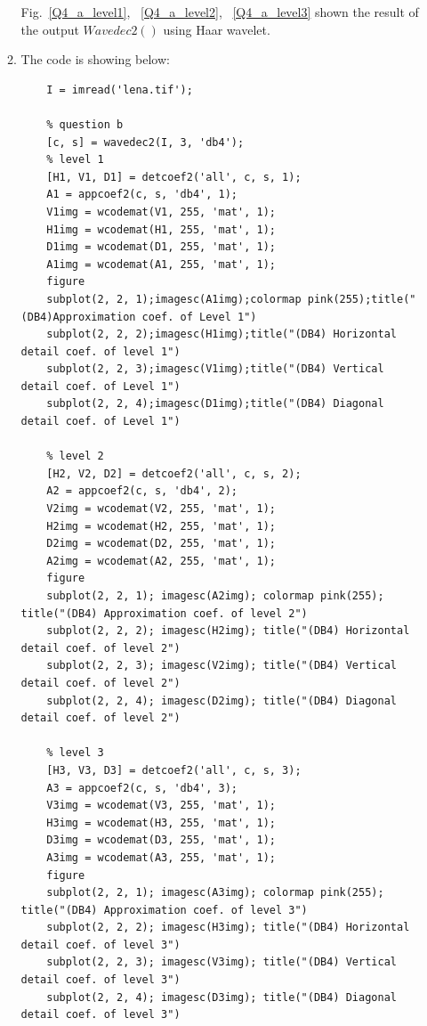 \documentclass[12pt]{article}
\begin{document}
\begin{enumerate}[leftmargin=\labelsep]
\begin{enumerate}
    Fig.~\ref{Q4_a_level1}, ~\ref{Q4_a_level2}, ~\ref{Q4_a_level3} shown the result of the output $Wavedec2()$ using Haar wavelet. 


    \item  The code is showing below:
\begin{lstlisting}
    I = imread('lena.tif');

    % question b
    [c, s] = wavedec2(I, 3, 'db4');
    % level 1
    [H1, V1, D1] = detcoef2('all', c, s, 1);
    A1 = appcoef2(c, s, 'db4', 1);
    V1img = wcodemat(V1, 255, 'mat', 1);
    H1img = wcodemat(H1, 255, 'mat', 1);
    D1img = wcodemat(D1, 255, 'mat', 1);
    A1img = wcodemat(A1, 255, 'mat', 1);
    figure
    subplot(2, 2, 1);imagesc(A1img);colormap pink(255);title("(DB4)Approximation coef. of Level 1")
    subplot(2, 2, 2);imagesc(H1img);title("(DB4) Horizontal detail coef. of level 1")
    subplot(2, 2, 3);imagesc(V1img);title("(DB4) Vertical detail coef. of Level 1")
    subplot(2, 2, 4);imagesc(D1img);title("(DB4) Diagonal detail coef. of Level 1")

    % level 2
    [H2, V2, D2] = detcoef2('all', c, s, 2);
    A2 = appcoef2(c, s, 'db4', 2);
    V2img = wcodemat(V2, 255, 'mat', 1);
    H2img = wcodemat(H2, 255, 'mat', 1);
    D2img = wcodemat(D2, 255, 'mat', 1);
    A2img = wcodemat(A2, 255, 'mat', 1);
    figure
    subplot(2, 2, 1); imagesc(A2img); colormap pink(255); title("(DB4) Approximation coef. of level 2")
    subplot(2, 2, 2); imagesc(H2img); title("(DB4) Horizontal detail coef. of level 2")
    subplot(2, 2, 3); imagesc(V2img); title("(DB4) Vertical detail coef. of level 2")
    subplot(2, 2, 4); imagesc(D2img); title("(DB4) Diagonal detail coef. of level 2")

    % level 3
    [H3, V3, D3] = detcoef2('all', c, s, 3);
    A3 = appcoef2(c, s, 'db4', 3);
    V3img = wcodemat(V3, 255, 'mat', 1);
    H3img = wcodemat(H3, 255, 'mat', 1);
    D3img = wcodemat(D3, 255, 'mat', 1);
    A3img = wcodemat(A3, 255, 'mat', 1);
    figure
    subplot(2, 2, 1); imagesc(A3img); colormap pink(255); title("(DB4) Approximation coef. of level 3")
    subplot(2, 2, 2); imagesc(H3img); title("(DB4) Horizontal detail coef. of level 3")
    subplot(2, 2, 3); imagesc(V3img); title("(DB4) Vertical detail coef. of level 3")
    subplot(2, 2, 4); imagesc(D3img); title("(DB4) Diagonal detail coef. of level 3")   
\end{lstlisting}
    

\end{enumerate}
\end{enumerate}
\end{document}
